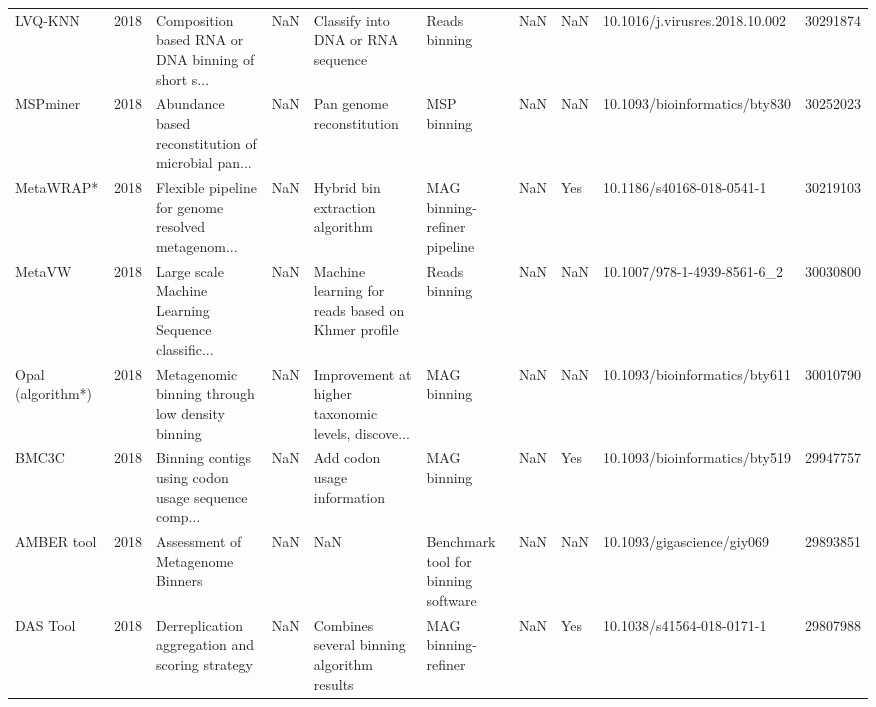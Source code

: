 \begin{tabular}{lrlllllllr}
                   LVQ-KNN &  2018 & Composition based RNA or DNA binning of short s... &            NaN &                  Classify into DNA or RNA sequence &                             Reads binning &                                            NaN &                        NaN & 10.1016/j.virusres.2018.10.002 &  30291874 \\
                  MSPminer &  2018 & Abundance based reconstitution of microbial pan... &            NaN &                          Pan genome reconstitution &                               MSP binning &                                            NaN &                        NaN &  10.1093/bioinformatics/bty830 &  30252023 \\
                 MetaWRAP* &  2018 & Flexible pipeline for genome resolved metagenom... &            NaN &                    Hybrid bin extraction algorithm &              MAG binning-refiner pipeline &                                            NaN &                        Yes &      10.1186/s40168-018-0541-1 &  30219103 \\
                    MetaVW &  2018 & Large scale Machine Learning Sequence classific... &            NaN &  Machine learning for reads based on Khmer profile &                             Reads binning &                                            NaN &                        NaN &    10.1007/978-1-4939-8561-6\_2 &  30030800 \\
         Opal (algorithm*) &  2018 &    Metagenomic binning through low density binning &            NaN & Improvement at higher taxonomic levels, discove... &                               MAG binning &                                            NaN &                        NaN &  10.1093/bioinformatics/bty611 &  30010790 \\
                     BMC3C &  2018 & Binning contigs using codon usage sequence comp... &            NaN &                        Add codon usage information &                               MAG binning &                                            NaN &                        Yes &  10.1093/bioinformatics/bty519 &  29947757 \\
                AMBER tool &  2018 &                   Assessment of Metagenome Binners &            NaN &                                                NaN &       Benchmark tool for binning software &                                            NaN &                        NaN &     10.1093/gigascience/giy069 &  29893851 \\
                  DAS Tool &  2018 &    Derreplication aggregation and scoring strategy &            NaN &         Combines several binning algorithm results &                       MAG binning-refiner &                                            NaN &                        Yes &      10.1038/s41564-018-0171-1 &  29807988 \\

\end{tabular}
